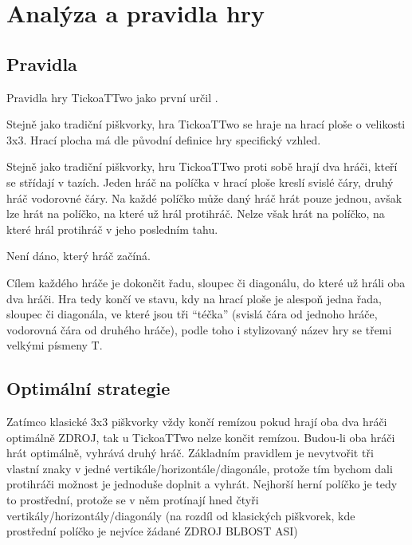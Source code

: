 \chapter{Analýza a pravidla hry}

\section{Pravidla}
Pravidla hry TickoaTTwo jako první určil \textcite{jenkins22}.

Stejně jako tradiční piškvorky, hra TickoaTTwo se hraje na hrací ploše o
velikosti 3x3. Hrací plocha má dle původní definice hry specifický vzhled.



Stejně jako tradiční piškvorky, hru TickoaTTwo proti sobě hrají dva hráči,
kteří se střídají v tazích. Jeden hráč na políčka v hrací ploše kreslí svislé
čáry, druhý hráč vodorovné čáry. Na každé políčko může daný hráč hrát pouze
jednou, avšak lze hrát na políčko, na které už hrál protihráč. Nelze však hrát
na políčko, na které hrál protihráč v jeho posledním tahu.

Není dáno, který hráč začíná.

Cílem každého hráče je dokončit řadu, sloupec či diagonálu, do které už hráli
oba dva hráči. Hra tedy končí ve stavu, kdy na hrací ploše je alespoň jedna
řada, sloupec či diagonála, ve které jsou tři \enquote{téčka} (svislá čára od
jednoho hráče, vodorovná čára od druhého hráče), podle toho i stylizovaný název
hry se třemi velkými písmeny T.



\section{Optimální strategie}
Zatímco klasické 3x3 piškvorky vždy končí remízou pokud hrají oba dva hráči optimálně
ZDROJ, tak u TickoaTTwo nelze končit remízou. Budou-li oba hráči hrát
optimálně, vyhrává druhý hráč. Základním pravidlem je nevytvořit tři vlastní
znaky v jedné vertikále/horizontále/diagonále, protože tím bychom dali
protihráči možnost je jednoduše doplnit a vyhrát. Nejhorší herní políčko je
tedy to prostřední, protože se v něm protínají hned čtyři
vertikály/horizontály/diagonály (na rozdíl od klasických piškvorek, kde
prostřední políčko je nejvíce žádané ZDROJ BLBOST ASI)

